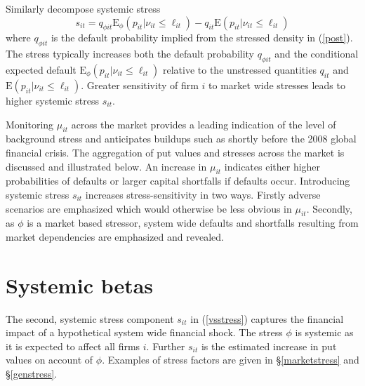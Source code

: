 \documentclass[authoryear]{elsarticle}
\newcommand{\E}{\mathrm{E}}
\newcommand{\eref}[1]{(\ref{#1})}
\newcommand{\sref}[1]{\S\ref{#1}}
\newcommand{\be}[1]{\begin{equation}\label{#1}}
\newcommand{\ee}{\end{equation}}
\begin{document}
Similarly decompose systemic stress
$$
s_{it} = q_{\phi it}\E_\phi(p_{it}|\nu_{it}\le \ell_{it})-q_{it}\E(p_{it}|\nu_{it} \le \ell_{it})
$$
where $q_{\phi it}$ is the default probability implied from the stressed density in \eref{post}. The stress typically increases both the default probability  $q_{\phi it}$ and the conditional expected default $\E_\phi(p_{it}|\nu_{it}\le \ell_{it})$ relative to the unstressed quantities $q_{it}$ and $\E(p_{it}|\nu_{it} \le \ell_{it})$. Greater sensitivity of firm $i$ to market wide stresses leads to higher systemic stress $s_{it}$.

Monitoring $\mu_{it}$ across the market provides a leading indication of the level of background stress and anticipates buildups such as shortly before the 2008 global financial crisis. The aggregation of put values and stresses across the market is discussed and illustrated below. An increase in $\mu_{it}$ indicates either higher probabilities of defaults or larger capital shortfalls if defaults occur. Introducing systemic stress $s_{it}$ increases stress-sensitivity in two ways. Firstly adverse scenarios are emphasized which would otherwise be less obvious in $\mu_{it}$. Secondly, as $\phi$ is a market based stressor, system wide defaults and shortfalls resulting from market dependencies are emphasized and revealed.

\section{Systemic betas}

The second, systemic stress component $s_{it}$ in  \eref{vsstress}  captures the financial impact of a  hypothetical system wide financial shock.   The stress $\phi$ is systemic as it is expected to affect all firms $i$.  Further $s_{it}$ is the estimated   increase in put values on account of  $\phi$.   Examples of stress factors are given in \sref{marketstress} and \sref{genstress}.
\end{document}
